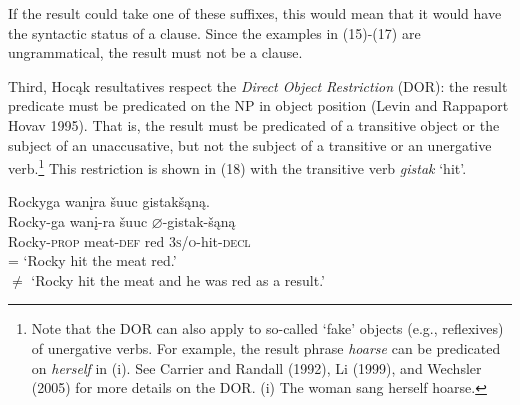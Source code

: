 \documentclass[output=paper]{LSP/langsci}
\begin{document}
\begin{exe}
\ex
\begin{xlist}



\end{xlist}
\end{exe}

If the result could take one of these suffixes, this would mean that it would have the syntactic status of a clause. Since the examples in (15)-(17) are ungrammatical, the result must not be a clause.

Third, Hocąk resultatives respect the \textit{Direct Object Restriction} (DOR): the result predicate must be predicated on the NP in object position (Levin and Rappaport Hovav 1995). That is, the result must be predicated of a transitive object or the subject of an unaccusative, but not the subject of a transitive or an unergative verb.\footnote{Note that the DOR can also apply to so-called `fake' objects (e.g., reflexives) of unergative verbs. For example, the result phrase \textit{hoarse} can be predicated on \textit{herself} in (i). See Carrier and Randall (1992), Li (1999), and Wechsler (2005) for more details on the DOR. (i) The woman sang herself hoarse.} This restriction is shown in (18) with the transitive verb \textit{gistak} `hit'.

\begin{exe}

\ex \glll Rockyga wanįra šuuc gistakšąną.\\ 
Rocky-ga wanį-ra šuuc {$\varnothing$}-gistak-šąną\\
Rocky-\textsc{prop} meat-\textsc{def} red \textsc{3s/o}-hit-\textsc{decl}\\
\glt = `Rocky hit the meat red.' \vspace{-3pt} \\ 
$\not=$ `Rocky hit the meat  and he was red as a result.'

\end{exe}
\end{document}
